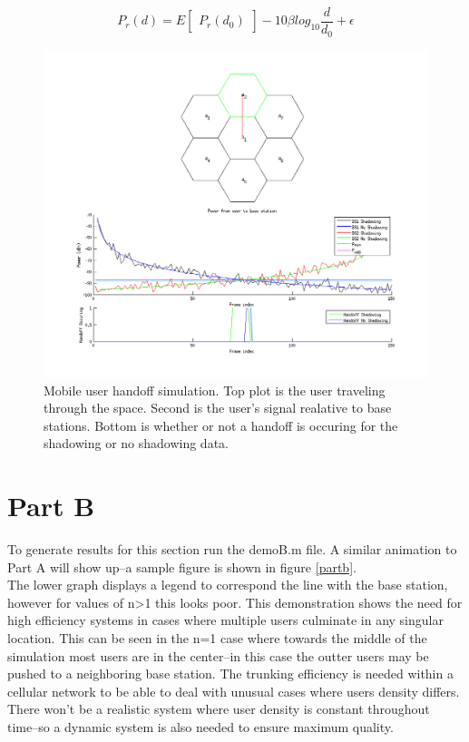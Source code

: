 \documentclass{article}
\begin{document}
\begin{equation}\label{pathloss}
P_r(d)=E\begin{bmatrix}P_r(d_0)\end{bmatrix}-10\beta log_{10}\dfrac{d}{d_0}+\epsilon
\end{equation}

\begin{figure}[h]
\centerline{\includegraphics[width=5in]{doc/partA.png}}
\caption{Mobile user handoff simulation. Top plot is the user traveling through the space. Second is the user's signal realative to base stations. Bottom is whether or not a handoff is occuring for the shadowing or no shadowing data.}
\label{parta}
\end{figure}

\clearpage

\section{Part B}\label{partB}

To generate results for this section run the demoB.m file. A similar animation to Part A will show up--a sample figure is shown in figure \ref{partb}. \\

The lower graph displays a legend to correspond the line with the base station, however for values of n>1 this looks poor. This demonstration shows the need for high efficiency systems in cases where multiple users culminate in any singular location. This can be seen in the n=1 case where towards the middle of the simulation most users are in the center--in this case the outter users may be pushed to a neighboring base station. The trunking efficiency is needed within a cellular network to be able to deal with unusual cases where users density differs. There won't be a realistic system where user density is constant throughout time--so a dynamic system is also needed to ensure maximum quality.\\
\end{document}

